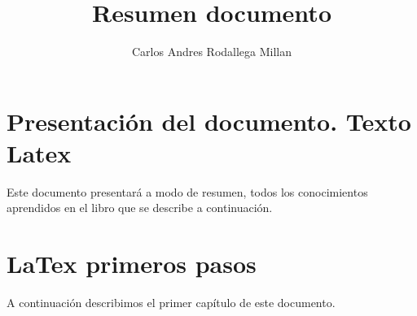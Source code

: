 \documentclass[11pt,letterpaper]{book}
\author{Carlos Andres Rodallega Millan}
\title{Resumen documento}
\begin{document}
\maketitle
\chapter{Presentación del documento. Texto Latex}
Este documento presentará a modo de resumen, todos los conocimientos aprendidos en el libro que se describe a continuación.
\chapter{LaTex primeros pasos}
A continuación describimos el primer capítulo de este documento.\\
\end{document}
